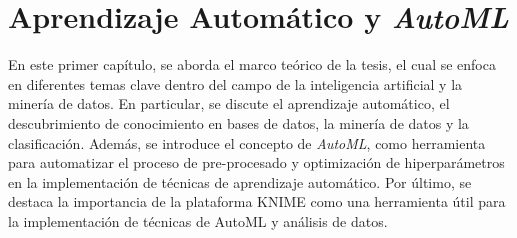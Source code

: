 \chapter{Aprendizaje Automático y \textit{AutoML}}\label{chap:1}

En este primer capítulo, se aborda el marco teórico de la tesis, el cual se enfoca en diferentes temas clave dentro del campo de la inteligencia artificial y la minería de datos. En particular, se discute el aprendizaje automático, el descubrimiento de conocimiento en bases de datos, la minería de datos y la clasificación. Además, se introduce el concepto de \textit{AutoML}, como herramienta para automatizar el proceso de pre-procesado y optimización de hiperparámetros en la implementación de técnicas de aprendizaje automático. Por último, se destaca la importancia de la plataforma KNIME como una herramienta útil para la implementación de técnicas de AutoML y análisis de datos.

